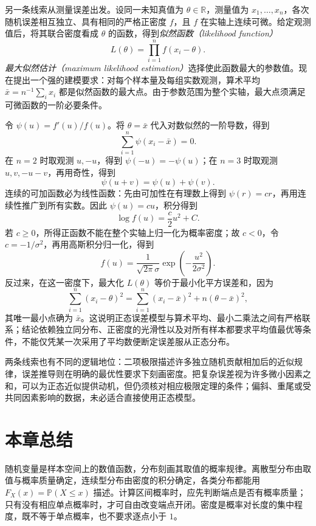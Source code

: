 另一条线索从测量误差出发。设同一未知真值为 $\theta\in\mathbb R$，测量值为 $x_1,\ldots,x_n$，各次随机误差相互独立、具有相同的严格正密度 $f$，且 $f$ 在实轴上连续可微。给定观测值后，将其联合密度看成 $\theta$ 的函数，得到\emph{似然函数（likelihood function）}
\[
  L(\theta)=\prod_{i=1}^nf(x_i-\theta).
\]
\emph{最大似然估计（maximum likelihood estimation）}选择使此函数最大的参数值。现在提出一个强的建模要求：对每个样本量及每组实数观测，算术平均 $\bar x=n^{-1}\sum_i x_i$ 都是似然函数的最大点。由于参数范围为整个实轴，最大点须满足可微函数的一阶必要条件。

令 $\psi(u)=f'(u)/f(u)$。将 $\theta=\bar x$ 代入对数似然的一阶导数，得到
\begin{equation}
  \sum_{i=1}^n\psi(x_i-\bar x)=0.
  \label{eq:study-gaussian-score-condition}
\end{equation}
在 $n=2$ 时取观测 $u,-u$，得到 $\psi(-u)=-\psi(u)$；在 $n=3$ 时取观测 $u,v,-u-v$，再用奇性，得到
\[
  \psi(u+v)=\psi(u)+\psi(v).
\]
连续的可加函数必为线性函数：先由可加性在有理数上得到 $\psi(r)=cr$，再用连续性推广到所有实数。因此 $\psi(u)=cu$，积分得到
\[
  \log f(u)=\frac c2u^2+C.
\]
若 $c\ge0$，所得正函数不能在整个实轴上归一化为概率密度；故 $c<0$，令 $c=-1/\sigma^2$，再用高斯积分归一化，得到
\begin{equation}
  f(u)=\frac1{\sqrt{2\pi}\sigma}
    \exp\left(-\frac{u^2}{2\sigma^2}\right).
  \label{eq:study-gaussian-error-characterization}
\end{equation}
反过来，在这一密度下，最大化 $L(\theta)$ 等价于最小化平方误差和，因为
\[
  \sum_{i=1}^n(x_i-\theta)^2
  =\sum_{i=1}^n(x_i-\bar x)^2+n(\theta-\bar x)^2,
\]
其唯一最小点确为 $\bar x$。这说明正态误差模型与算术平均、最小二乘法之间有严格联系；结论依赖独立同分布、正密度的光滑性以及对所有样本都要求平均值最优等条件，不能仅凭某一次采用了平均数便断定误差服从正态分布。

两条线索也有不同的逻辑地位：二项极限描述许多独立随机贡献相加后的近似规律，误差推导则在明确的最优性要求下刻画密度。把复杂误差视为许多微小因素之和，可以为正态近似提供动机，但仍须核对相应极限定理的条件；偏斜、重尾或受共同因素影响的数据，未必适合直接使用正态模型。

\section*{本章总结}

随机变量是样本空间上的数值函数，分布刻画其取值的概率规律。离散型分布由取值与概率质量确定，连续型分布由密度的积分确定，各类分布都能用 $F_X(x)=\mathbb P(X\le x)$ 描述。计算区间概率时，应先判断端点是否有概率质量；只有没有相应单点概率时，才可自由改变端点开闭。密度是概率对长度的集中程度，既不等于单点概率，也不要求逐点小于 $1$。

